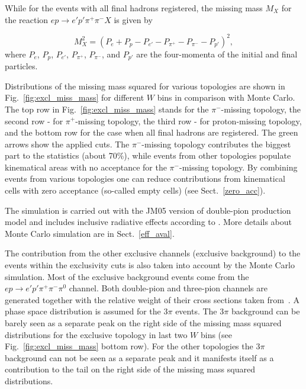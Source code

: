 While for the events with all final hadrons registered, the missing mass $M_{X}$ for the reaction $e p \rightarrow e' p' \pi^+ \pi^- X$ is given by

\begin{equation}
M_{X}^{2} = (P_{e} + P_{p} -P_{e'} - P_{\pi^+} - P_{\pi^-} - P_{p'})^{2},
\label{eg:miss_mass_zero}
\end{equation} 
where $P_{e}$, $P_{p}$, $P_{e'}$, $P_{\pi^+}$, $P_{\pi^-}$,  and $P_{p'}$  are the four-momenta of the initial and final particles.

Distributions of the missing mass squared for various topologies are shown in Fig.~\ref{fig:excl_miss_mass} for different $W$ bins in comparison with Monte Carlo. The top row in Fig.~\ref{fig:excl_miss_mass} stands for the $\pi^-$-missing topology, the second row - for $\pi^+$-missing topology, the third row - for proton-missing topology, and the bottom row for the case when all final hadrons are registered. The green arrows show the applied cuts. The $\pi^-$-missing topology contributes the biggest part to the statistics (about 70\%), while events from other topologies populate kinematical areas with no acceptance for the $\pi^-$-missing topology. 
By combining events from various topologies one can reduce contributions from kinematical cells with zero acceptance (so-called empty cells) (see Sect.~\ref{zero_acc}).

The simulation is carried out with the JM05 version of double-pion production model \cite{Ripani:2000va,Aznauryan:2005tp,Mokeev:2005re} and includes inclusive radiative effects according to \cite{Mo:1968cg}. More details about Monte Carlo simulation are in Sect.~\ref{eff_aval}.



The contribution from the other exclusive channels (exclusive background) to the events within the exclusivity cuts is also taken into account by the Monte Carlo simulation. Most of the exclusive background events come from the $e p \rightarrow e' p' \pi^{+} \pi^{-} \pi^{0}$ channel. Both double-pion and three-pion channels are generated together with the relative weight of their cross sections taken from~\cite{Wu:2005wf}.  A phase space distribution is assumed for the $3\pi$ events. The $3\pi$ background can be barely seen as a separate peak on the right side of the missing mass squared distributions for the exclusive topology in last two $W$ bins (see Fig.~\ref{fig:excl_miss_mass} bottom row). For the other topologies the $3\pi$ background can not be seen as a separate peak and it manifests itself as a contribution to the tail on the right side of the missing mass squared distributions.

